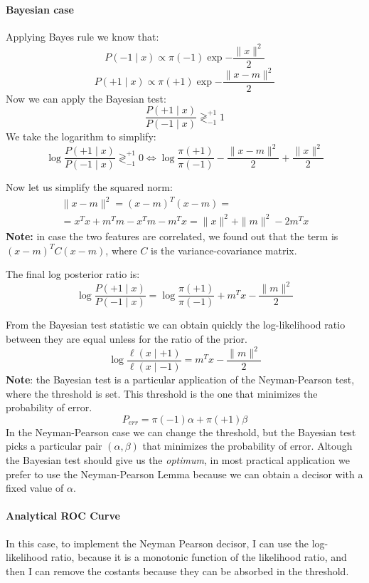 \paragraph*{Bayesian case}
Applying Bayes rule we know that:
\[
    P(-1 \mid x) \propto \pi(-1) \exp{- \frac{\|x\|^2}{2}}
\]
\[
    P(+1 \mid x) \propto \pi(+1) \exp{- \frac{\|x-m\|^2}{2}}
\]
Now we can apply the Bayesian test:
\[
    \frac{P(+1 \mid x)}{P(-1 \mid x)} \gtrless^{+1}_{-1} 1
\]
We take the logarithm to simplify:
\[
    \log \frac{P(+1 \mid x)}{P(-1 \mid x)} \gtrless^{+1}_{-1} 0 \Leftrightarrow \log\frac{\pi(+1)}{\pi(-1)} -  \frac{\|x-m\|^2}{2} + \frac{\|x\|^2}{2}
\]

Now let us simplify the squared norm:
\begin{align*}
    \|x-m\|^2 = (x-m)^T (x-m) = \\
    = x^T x + m^T m - x^T m - m^T x = \|x\|^2 + \|m\|^2 - 2m^T x
\end{align*}
\textbf{Note:} in case the two features are correlated, we found out that the term is $(x-m)^T C (x-m)$, where $C$ is the variance-covariance matrix.

The final log posterior ratio is:
\[
    \log \frac{P(+1 \mid x)}{P(-1 \mid x)} = \log\frac{\pi(+1)}{\pi(-1)} + m^T x - \frac{\|m\|^2}{2}
\]


From the Bayesian test statistic we can obtain quickly the log-likelihood ratio between they are equal unless for the ratio of the prior.
\[
    \log \frac{\ell(x \mid +1)}{\ell(x \mid -1)} = m^T x - \frac{\|m\|^2}{2}
\]
\textbf{Note}: the Bayesian test is a particular application of the Neyman-Pearson test, where the threshold is set. This threshold is the one that minimizes the probability of error.
\[
    P_{err} = \pi(-1) \alpha + \pi(+1)\beta
\]
In the Neyman-Pearson case we can change the threshold, but the Bayesian test picks a particular pair $(\alpha, \beta)$ that minimizes the probability of error. Altough the Bayesian test should give us the \textit{optimum}, in most practical application we prefer to use the Neyman-Pearson Lemma because we can obtain a decisor with a fixed value of $\alpha$.

\paragraph*{Analytical ROC Curve}
In this case, to implement the Neyman Pearson decisor, I can use the log-likelihood ratio, because it is a monotonic function of the likelihood ratio, and then I can remove the costants because they can be absorbed in the threshold.

